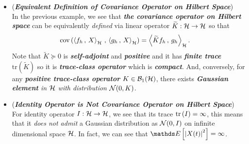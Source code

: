 \documentclass[11pt]{article}
\begin{document}
\begin{itemize}
\begin{example}
%
\end{example}

\item \begin{remark} (\emph{\textbf{Equivalent Definition of Covariance Operator on Hilbert Space}})\\
In the previous example, we see that \emph{\textbf{the covariance operator on Hilbert space}} can be equivalently \emph{defined} via linear operator $\widetilde{K}: {\mathcal H} \rightarrow {\mathcal H}$ so that 
\begin{align*}
\text{cov}\left( \left\langle f_{h}\,,\, X \right\rangle_{{\mathcal H}}\,,\, \left\langle g_{h}\,,\, X \right\rangle_{{\mathcal H}} \right) &= \left\langle \widetilde{K}f_h\,,\, g_h \right\rangle_{{\mathcal H}}.
\end{align*} Note that $\widetilde{K} \succeq 0$ is \emph{\textbf{self-adjoint}} and \emph{\textbf{positive}} and it has \emph{\textbf{finite trace}} $\text{tr}(\widetilde{K})$ so it is \emph{\textbf{trace-class operator}} which is \emph{\textbf{compact}}. And, conversely, for any \emph{\textbf{positive trace-class operator}} $K \in {\mathcal B}_1({\mathcal H})$, there exists \emph{\textbf{Gaussian element} in ${\mathcal H}$ with distribution ${\mathcal N}(0, K)$}.
\end{remark}

\item \begin{remark} (\emph{\textbf{Identity Operator is Not Covariance Operator on Hilbert Space}})\\
For identity operator $I: {\mathcal H} \rightarrow {\mathcal H}$, we see that its trace $\mathrm{tr}\left(I \right) = \infty$, this means that it \emph{does not admit }a Gaussian distribution as ${\mathcal N}(0, I)$ on infinite dimensional space ${\mathcal H}$. In fact, we can see that $\E{}{\abs{X(t)}^2} = \infty$.
\end{remark}
\end{itemize}
\end{document}
